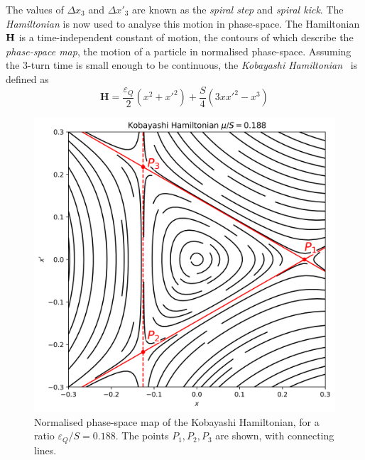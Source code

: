 \documentclass[a4paper,twoside,11pt]{report}
\begin{document}
The values of $\Delta x_3$ and $\Delta x'_3$ are known as the \textit{spiral step} and \textit{spiral kick}.
The \textit{Hamiltonian} is now used to analyse this motion in phase-space. The Hamiltonian $\bf H$ is a time-independent constant of motion, the contours of which describe the \textit{phase-space map}, the motion of a particle in normalised phase-space. Assuming the 3-turn time is small enough to be continuous, the \textit{Kobayashi Hamiltonian}~\cite{kobayashi} is defined as
\begin{equation}
  \textbf{H} =\frac{\varepsilon_Q} 2(x^2+x'^2)+\frac S4(3xx'^2-x^3)
\end{equation}

\begin{figure}
  \centering
  \includegraphics[width=0.6\linewidth]{kobayashi.png}
  \caption[Phase-space map of the Kobayashi Hamiltonian]{Normalised phase-space map of the Kobayashi Hamiltonian, for a ratio ${\varepsilon_Q}/S=0.188$. The points $P_1, P_2, P_3$ are shown, with connecting lines.}\label{fig:kobayashi}
\end{figure}
\end{document}
